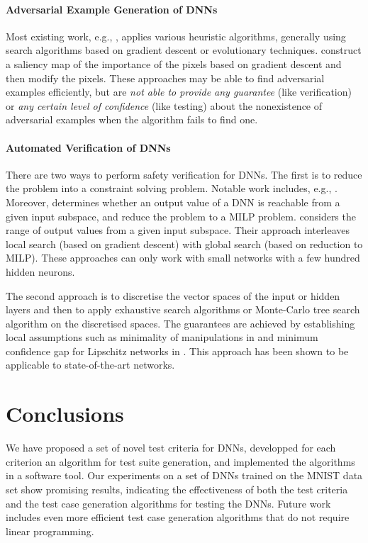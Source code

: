 \documentclass[runningheads,a4paper]{llncs}
\begin{document}
\paragraph{Adversarial Example Generation of DNNs}

Most existing work, e.g.,
\cite{SZSBEGF2014,GSS2014,AJJ2014,SAOP2016,CW2016}, applies various
heuristic algorithms, generally using search algorithms based on gradient
descent or evolutionary techniques.  \cite{PMJFCS2015} construct a saliency
map of the importance of the pixels based on gradient descent and then
modify the pixels.  These approaches may be able to find adversarial
examples efficiently, but are \emph{not able to provide any guarantee} (like
verification) or \emph{any certain level of confidence} (like testing) about
the nonexistence of adversarial examples when the algorithm fails to find
one.

\paragraph{Automated Verification of DNNs}

There are two ways to perform safety verification for DNNs.  The first is
to reduce the problem into a constraint solving problem.  Notable work
includes, e.g., \cite{PT2010,katz2017reluplex}.
Moreover, 
determines whether an output value of a DNN is reachable from a given input
subspace, and reduce the problem to a MILP problem.  \cite{dutta2017output}
considers the range of output values from a given input subspace.  Their
approach interleaves local search (based on gradient descent) with global
search (based on reduction to MILP).  These approaches can only work with
small networks
with a few hundred hidden neurons. 

The second approach is to discretise the vector spaces of the input or hidden layers
and then to apply exhaustive search algorithms or Monte-Carlo tree search
algorithm on the discretised spaces.  The guarantees are achieved by
establishing local assumptions such as minimality of manipulations in
\cite{HKWW2017} and minimum confidence gap for Lipschitz networks in
\cite{WHK2018}.  This approach has been shown to be applicable to
state-of-the-art networks.

\section{Conclusions}\label{sec:concl}

We have proposed a set of novel test criteria for DNNs, developped for each
criterion an algorithm for test suite generation, and implemented the
algorithms in a software tool.  Our experiments on a set of DNNs trained on
the MNIST data set show promising results, indicating the effectiveness of
both the test criteria and the test case generation algorithms for testing
the DNNs.  Future work includes even more efficient test case generation
algorithms that do not require linear programming.




\end{document}
